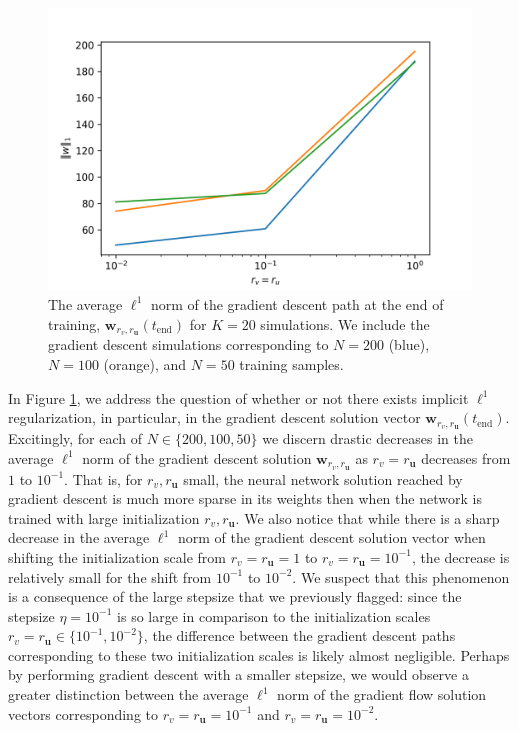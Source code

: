 \documentclass{article}
\begin{document}
\begin{figure}[H]
    \centering
    \includegraphics{Imgs/Sparse Logistic Regression/param_l1_avg.png}
    \caption{The average $\ell^1$ norm of the gradient descent path at the end of training, $\boldsymbol{w}_{r_v, r_{\boldsymbol{u}}}(t_{\text{end}})$ for $K=20$ simulations. We include the gradient descent simulations corresponding to $N=200$ (blue), $N=100$ (orange), and $N=50$ training samples.}
    \label{fig:solutionl1logistic}
\end{figure}

In Figure \ref{fig:solutionl1logistic}, we address the question of whether or not there exists implicit $\ell^1$ regularization, in particular, in the gradient descent solution vector $\boldsymbol{w}_{r_v, r_{\boldsymbol{u}}}(t_{\text{end}})$. Excitingly, for each of $N \in \{200, 100, 50\}$ we discern drastic decreases in the average $\ell^1$ norm of the gradient descent solution $\boldsymbol{w}_{r_v, r_{\boldsymbol{u}}}$ as $r_v = r_{\boldsymbol{u}}$ decreases from $1$ to $10^{-1}$. That is, for $r_v, r_{\boldsymbol{u}}$ small, the neural network solution reached by gradient descent is much more sparse in its weights then when the network is trained with large initialization $r_v, r_{\boldsymbol{u}}$. We also notice that while there is a sharp decrease in the average $\ell^1$ norm of the gradient descent solution vector when shifting the initialization scale from $r_v = r_{\boldsymbol{u}} = 1$ to $r_v = r_{\boldsymbol{u}} = 10^{-1}$, the decrease is relatively small for the shift from $10^{-1}$ to $10^{-2}$. We suspect that this phenomenon is a consequence of the large stepsize that we previously flagged: since the stepsize $\eta = 10^{-1}$ is so large in comparison to the initialization scales $r_v = r_{\boldsymbol{u}} \in \{10^{-1}, 10^{-2} \}$, the difference between the gradient descent paths corresponding to these two initialization scales is likely almost negligible. Perhaps by performing gradient descent with a smaller stepsize, we would observe a greater distinction between the average $\ell^1$ norm of the gradient flow solution vectors corresponding to $r_v = r_{\boldsymbol{u}} = 10^{-1}$ and $r_v = r_{\boldsymbol{u}} = 10^{-2}$. 
\end{document}
